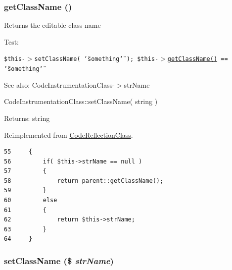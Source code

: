 \hypertarget{class_code_instrumentation_class_b8f8ee56588ebf5091c288e44ebdfaf4}{
\subsubsection[{getClassName}]{\setlength{\rightskip}{0pt plus 5cm}getClassName ()}}
\label{class_code_instrumentation_class_b8f8ee56588ebf5091c288e44ebdfaf4}


Returns the editable class name

\begin{Desc}
\item[Test:]\end{Desc}
{\tt  \$this-$>$setClassName( \char`\"{}something\char`\"{} ); \$this-$>$\hyperlink{class_code_instrumentation_class_b8f8ee56588ebf5091c288e44ebdfaf4}{getClassName()} == \char`\"{}something\char`\"{} }

\begin{Desc}
\item[See also:]CodeInstrumentationClass-$>$strName 

CodeInstrumentationClass::setClassName( string ) \end{Desc}
\begin{Desc}
\item[Returns:]string \end{Desc}


Reimplemented from \hyperlink{class_code_reflection_class_b8f8ee56588ebf5091c288e44ebdfaf4}{CodeReflectionClass}.

\begin{Code}\begin{verbatim}55     {
56         if( $this->strName == null )
57         {
58             return parent::getClassName();
59         }
60         else
61         {
62             return $this->strName;
63         }
64     }
\end{verbatim}
\end{Code}


\hypertarget{class_code_instrumentation_class_6392a64e001e141c882fad5419990557}{
\subsubsection[{setClassName}]{\setlength{\rightskip}{0pt plus 5cm}setClassName (\$ {\em strName})}}
\label{class_code_instrumentation_class_6392a64e001e141c882fad5419990557}


